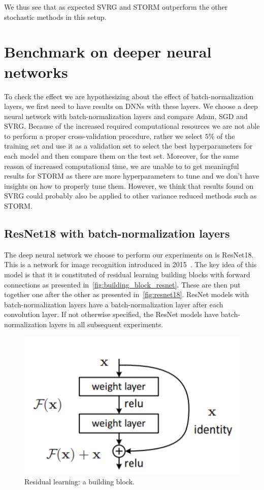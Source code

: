 \documentclass[a4paper,11pt,oneside]{report}
\begin{document}
We thus see that as expected SVRG and STORM outperform the other stochastic methods in this setup.


\section{Benchmark on deeper neural networks}
To check the effect we are hypothesizing about the effect of batch-normalization layers, we first need to have results on DNNs with these layers. We choose a deep neural network with batch-normalization layers and compare Adam, SGD and SVRG. Because of the increased required computational resources we are not able to perform a proper cross-validation procedure, rather we select $5\%$ of the training set and use it as a validation set to select the best hyperparameters for each model and then compare them on the test set. Moreover, for the same reason of increased computational time, we are unable to to get meaningful results for STORM as there are more hyperparameters to tune and we don't have insights on how to properly tune them. However, we think that results found on SVRG could probably also be applied to other variance reduced methods such as STORM.


\subsection{ResNet18 with batch-normalization layers}


The deep neural network we choose to perform our experiments on is ResNet18. This is a network for image recognition introduced in 2015~\cite{he2015deep}. The key idea of this model is that it is constituted of residual learning building blocks with forward connections as presented in~\autoref{fig:building_block_resnet}. These are then put together one after the other as presented in~\autoref{fig:resnet18}. ResNet models with batch-normalization layers have a batch-normalization layer after each convolution layer. If not otherwise specified, the ResNet models have batch-normalization layers in all subsequent experiments.

\begin{figure}
    \centering
    \includegraphics[scale=1]{midterm presentation/images/building_block_ResNet.png}
    \caption{Residual learning: a building block.}
    \label{fig:building_block_resnet}
\end{figure}
\end{document}
